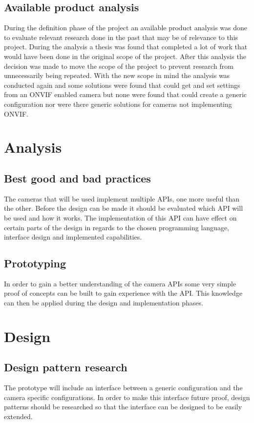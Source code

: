 \documentclass[11pt, a4paper,nomath,nopackage]{siltex-report}
\begin{document}
\subsection{Available product analysis}
During the definition phase of the project an available product analysis was done to evaluate relevant research done in the past that may be of relevance to this
project. During the analysis a thesis \cite{kesteloo_onvif_2016} was found that completed a lot of work that would have been done in the original scope of the project. After
this analysis the decision was made to move the scope of the project to prevent research from unnecessarily being repeated. With the new scope in mind the analysis was
conducted again and some solutions were found that could get and set settings from an ONVIF enabled camera but none were found that could create a generic configuration nor
were there generic solutions for cameras not implementing ONVIF.

\section{Analysis}
\subsection{Best good and bad practices}
The cameras that will be used implement multiple APIs, one more useful than the other. Before the design can be made it should be evaluated which API will be used and
how it works. The implementation of this API can have effect on certain parts of the design in regards to the chosen programming language, interface design and
implemented capabilities.

\subsection{Prototyping}
In order to gain a better understanding of the camera APIs some very simple proof of concepts can be built to gain experience with the API. This knowledge can then be applied during the design and implementation phases.

\section{Design}
\subsection{Design pattern research}
The prototype will include an interface between a generic configuration and the camera specific configurations. In order to make this interface future proof, design patterns should be researched so that the interface can be designed to be easily extended.
\end{document}

